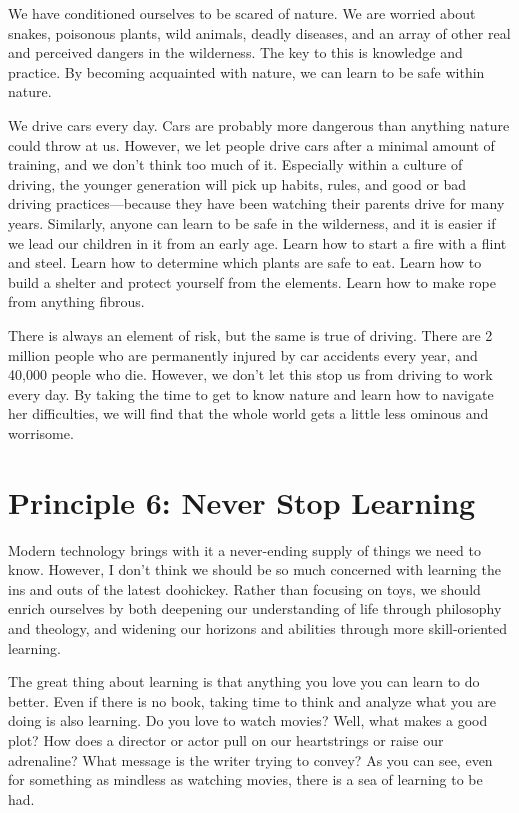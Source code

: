 We have conditioned ourselves to be scared of nature. We are worried
about snakes, poisonous plants, wild animals, deadly diseases, and an
array of other real and perceived dangers in the wilderness. The key to
this is knowledge and practice. By becoming acquainted with nature, we
can learn to be safe within nature. 

We drive cars every day. Cars are probably more dangerous than anything
nature could throw at us. However, we let people drive cars after a
minimal amount of training, and
we
don't think too much of it. Especially
within a culture of
driving, the younger
generation will pick up habits, rules, and good or bad driving
practices—because they have been watching their parents drive for many
years. Similarly, anyone can learn to be safe in the wilderness, and
it is easier if we lead our children in it from an early age. Learn how
to start a fire with a flint and steel. Learn how to determine which
plants are safe to eat. Learn how to build a shelter and protect
yourself from the elements. Learn how to make rope from anything
fibrous. 

There is always an element of risk, but the same is true of driving.
There are 2 million people who are permanently injured by car accidents
every year, and 40,000 people who die. However, we
don't let this stop us from driving to work every day.
By taking the time to get to know nature and learn how to navigate her
difficulties, we will find that the whole world gets a little less
ominous and worrisome. 

\section{Principle 6: Never Stop Learning}

Modern technology brings with it a never-ending supply of things we need
to know. However, I don't think we should be so much
concerned with learning the ins and outs of the latest doohickey.
Rather than focusing on toys, we should enrich ourselves by both
deepening our understanding of life through philosophy and theology,
and widening our horizons and abilities through more skill-oriented
learning.

The great thing about learning is that anything you love you can learn
to do better. Even if there is no book, taking time to think and
analyze what you are doing is also learning. Do you love to watch
movies? Well, what makes a good plot?  How does a director or actor
pull on our heartstrings or raise our adrenaline?  What message is the
writer trying to convey?  As you can see, even for something as
mindless as watching movies, there is a sea of learning to be had.

